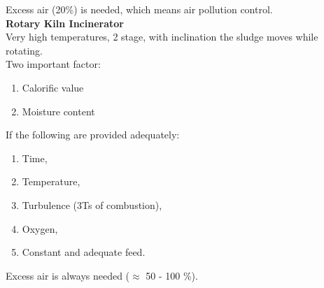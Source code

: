 \documentclass[12pt]{article}
\begin{document}
Excess air (20\%) is needed, which means air pollution control.\\
\textbf{Rotary Kiln Incinerator}\\
Very high temperatures, 2 stage, with inclination the sludge moves while rotating.\\
Two important factor:
\begin{enumerate}
    \item Calorific value
    \item Moisture content
\end{enumerate}
If the following are provided adequately:
\begin{enumerate}
    \item Time,
    \item Temperature,
    \item Turbulence (3Ts of combustion),
    \item Oxygen,
    \item Constant and adequate feed.
\end{enumerate}
Excess air is always needed ($\approx$ 50 - 100 \%).
\end{document}
